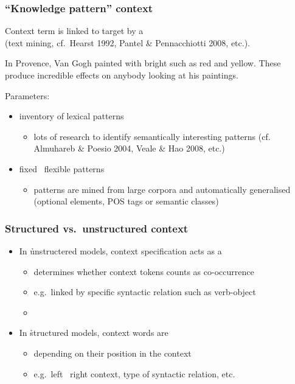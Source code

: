 \documentclass[t]{beamer} %
\begin{document}
\begin{frame}
  \frametitle{``Knowledge pattern'' context}
  
  \begin{center}
    Context term is linked to target by a \\
    (text mining, cf.\ Hearst 1992, Pantel \& Pennacchiotti 2008, etc.).
  \end{center}  

  In Provence, Van Gogh painted with bright 
  {\color{counterpoint}such as} {\color{secondary}red} {\color{counterpoint}and}
  {\color{secondary}yellow}.  These 
  {\color{counterpoint}produce} incredible {\color{secondary}effects} on
  anybody looking at his paintings.
  
  \gap
  Parameters:
  \begin{itemize}
  \item inventory of lexical patterns
    \begin{itemize}
    \item lots of research to identify semantically interesting patterns (cf. Almuhareb \& Poesio 2004,
      Veale \& Hao 2008, etc.)
    \end{itemize}
  \item fixed \vs\ flexible patterns
    \begin{itemize}
    \item patterns are mined from large corpora and automatically generalised (optional elements, POS tags or semantic classes)
    \end{itemize}
  \end{itemize}
\end{frame}

\begin{frame}[c]
  \frametitle{Structured vs.\ unstructured context}

  \begin{itemize}
  \item In \h{unstructered} models, context specification acts as a 
    \begin{itemize}
    \item determines whether context tokens counts as co-occurrence
    \item e.g.\ linked by specific syntactic relation such as verb-object
    \item[]
    \end{itemize}
    \pause
  \item In \h{structured} models, context words are 
    \begin{itemize}
    \item depending on their position in the context
    \item e.g.\ left \vs\ right context, type of syntactic relation, etc.
    \end{itemize}
  \end{itemize}
\end{frame}
\end{document}
